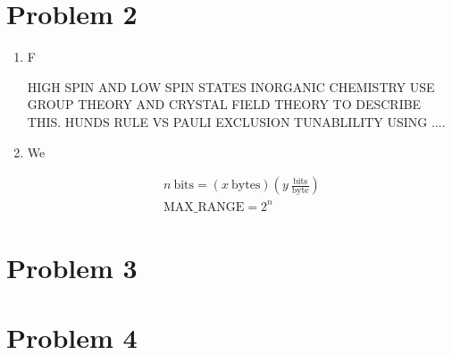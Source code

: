 \documentclass[12pt]{exam}
\begin{document}
    \section*{\label{sec:prob2} Problem 2}

        \begin{enumerate} %

            \item F



                HIGH SPIN AND LOW SPIN STATES INORGANIC CHEMISTRY USE GROUP THEORY AND CRYSTAL FIELD THEORY TO DESCRIBE THIS. HUNDS RULE VS PAULI EXCLUSION TUNABLILITY USING ....
            \item We 

            
            \begin{gather*}
                n \: \text{bits} = \left(x \: \text{bytes}\right) \left(y \: \frac{\text{bits}}{\text{byte}}\right) \\
                \text{MAX\_RANGE} = 2^{n}
            \end{gather*}

            

        \end{enumerate}
    \section*{\label{sec:prob3} Problem 3}

    \section*{\label{sec:prob4} Problem 4}
\end{document}
